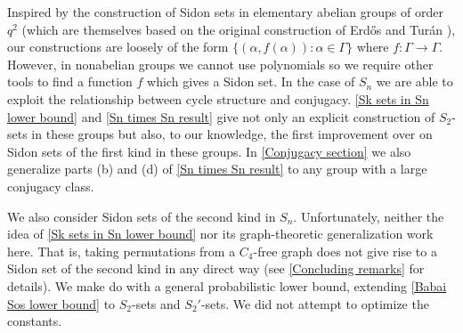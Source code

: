 \documentclass[12pt]{article}
\begin{document}
Inspired by the construction of Sidon sets in elementary abelian groups of order $q^2$ \cite{lindstrom1969determination,babai1985sidon} (which are themselves based on the original construction of Erd\H{o}s and Tur\'an \cite{erdos1941problem}), our constructions are loosely of the form $\{(\alpha,f(\alpha)):\alpha\in\Gamma\}$ where $f:\Gamma\to\Gamma$. However, in nonabelian groups we cannot use polynomials so we require other tools to find a function $f$ which gives a Sidon set. In the case of $S_n$ we are able to exploit the relationship between cycle structure and conjugacy. \autoref{Sk sets in Sn lower bound} and \autoref{Sn times Sn result} give not only an explicit construction of $S_2$-sets in these groups but also, to our knowledge, the first improvement over \cite{godsil1987embedding} on Sidon sets of the first kind in these groups. In \autoref{Conjugacy section} we also generalize parts (b) and (d) of \autoref{Sn times Sn result} to any group with a large conjugacy class.

We also consider Sidon sets of the second kind in $S_n$. Unfortunately, neither the idea of \autoref{Sk sets in Sn lower bound} nor its graph-theoretic generalization work here. That is, taking permutations from a $C_4$-free graph does not give rise to a Sidon set of the second kind in any direct way (see \autoref{Concluding remarks} for details). We make do with a general probabilistic lower bound, extending \autoref{Babai Sos lower bound} to $S_2$-sets and $S_2'$-sets. We did not attempt to optimize the constants.
\end{document}

